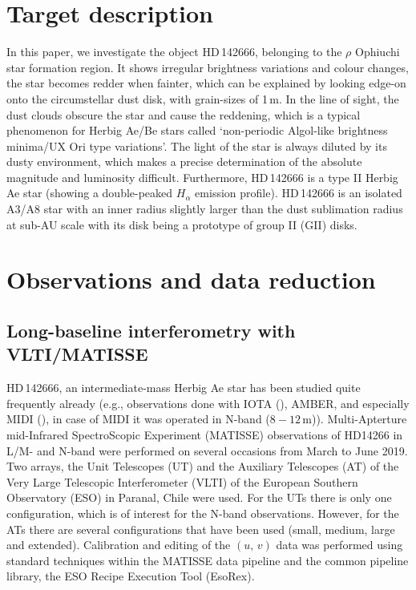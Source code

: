 \documentclass{aa}
\newcommand{\m}{\textmu}
\newcommand{\umum}{\,\m$\mathrm{m}$}
\begin{document}
\section{Target description}
In this paper, we investigate the object HD\,142666, belonging to the $\rho$
Ophiuchi star formation region\citet{Schegerer2013}. It shows
irregular brightness variations and colour changes, the star becomes redder when
fainter, which can be explained by looking edge-on onto the circumstellar dust
disk, with grain-sizes of 1\umum. In the line of sight, the dust clouds obscure
the star and cause the reddening, which is a typical phenomenon for Herbig
Ae/Be stars called `non-periodic Algol-like brightness minima/UX Ori type
variations'. The light of the star is always diluted by its dusty
environment, which makes a precise determination of the absolute magnitude and
luminosity difficult. Furthermore, HD\,142666 is a type II Herbig Ae star
(showing a double-peaked $H_{\alpha}$ emission profile)\citet{Zwintz2008}.
HD\,142666 is an isolated A3/A8 star with an inner radius slightly larger than
the dust sublimation radius at sub-AU scale with its disk being a prototype of group II (GII)
disks\citet{Garufi2017}.
\section{Observations and data reduction}
\subsection{Long-baseline interferometry with  VLTI/MATISSE}
HD\,142666, an intermediate-mass Herbig Ae star has been studied quite frequently already
(e.g., observations done with IOTA (), AMBER, and especially MIDI (), in case
of MIDI it was operated in N-band ($8-12$\umum)\citet{Schegerer2013}).
Multi-Apterture mid-Infrared SpectroScopic Experiment (MATISSE) observations of
HD14266 in L/M- and N-band were performed on several occasions from March to June 2019.
Two arrays, the Unit Telescopes (UT) and the Auxiliary Telescopes (AT) of the Very Large Telescopic Interferometer (VLTI) of the European Southern Observatory (ESO) in Paranal, Chile were used.
For the UTs there is only one configuration, which is of interest for the N-band observations.
However, for the ATs there are several configurations that have been used (small, medium, large and extended).
Calibration and editing of the $\left(\textit{u, v}\right)$ data was performed using standard techniques within the MATISSE data pipeline and the common pipeline library, the ESO Recipe Execution Tool (EsoRex).
\end{document}
